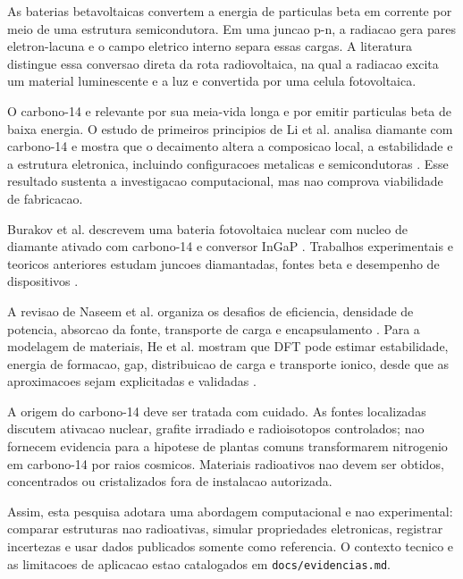 As baterias betavoltaicas convertem a energia de particulas beta em corrente por meio de uma estrutura semicondutora. Em uma juncao p-n, a radiacao gera pares eletron-lacuna e o campo eletrico interno separa essas cargas. A literatura distingue essa conversao direta da rota radiovoltaica, na qual a radiacao excita um material luminescente e a luz e convertida por uma celula fotovoltaica.

O carbono-14 e relevante por sua meia-vida longa e por emitir particulas beta de baixa energia. O estudo de primeiros principios de Li et al. analisa diamante com carbono-14 e mostra que o decaimento altera a composicao local, a estabilidade e a estrutura eletronica, incluindo configuracoes metalicas e semicondutoras \cite{li2023c14}. Esse resultado sustenta a investigacao computacional, mas nao comprova viabilidade de fabricacao.

Burakov et al. descrevem uma bateria fotovoltaica nuclear com nucleo de diamante ativado com carbono-14 e conversor InGaP \cite{burakov2025photovoltaic}. Trabalhos experimentais e teoricos anteriores estudam juncoes diamantadas, fontes beta e desempenho de dispositivos \cite{amosov2018experimental,shimaoka2020ultrahigh,xi2024schottky,bormashov2018high}.

A revisao de Naseem et al. organiza os desafios de eficiencia, densidade de potencia, absorcao da fonte, transporte de carga e encapsulamento \cite{naseem2023review}. Para a modelagem de materiais, He et al. mostram que DFT pode estimar estabilidade, energia de formacao, gap, distribuicao de carga e transporte ionico, desde que as aproximacoes sejam explicitadas e validadas \cite{he2019dft}.

A origem do carbono-14 deve ser tratada com cuidado. As fontes localizadas discutem ativacao nuclear, grafite irradiado e radioisotopos controlados; nao fornecem evidencia para a hipotese de plantas comuns transformarem nitrogenio em carbono-14 por raios cosmicos. Materiais radioativos nao devem ser obtidos, concentrados ou cristalizados fora de instalacao autorizada.

Assim, esta pesquisa adotara uma abordagem computacional e nao experimental: comparar estruturas nao radioativas, simular propriedades eletronicas, registrar incertezas e usar dados publicados somente como referencia. O contexto tecnico e as limitacoes de aplicacao estao catalogados em \texttt{docs/evidencias.md}.
